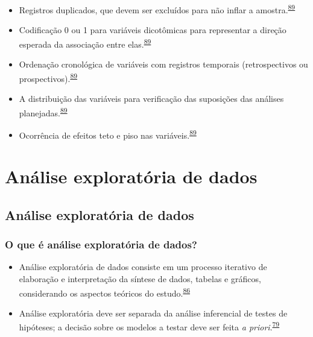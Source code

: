 \documentclass[
  a4paper,
]{book}
\begin{document}
\begin{itemize}
\item
  Registros duplicados, que devem ser excluídos para não inflar a amostra.\textsuperscript{\protect\hyperlink{ref-huebner2016}{89}}
\item
  Codificação 0 ou 1 para variáveis dicotômicas para representar a direção esperada da associação entre elas.\textsuperscript{\protect\hyperlink{ref-huebner2016}{89}}
\item
  Ordenação cronológica de variáveis com registros temporais (retrospectivos ou prospectivos).\textsuperscript{\protect\hyperlink{ref-huebner2016}{89}}
\item
  A distribuição das variáveis para verificação das suposições das análises planejadas.\textsuperscript{\protect\hyperlink{ref-huebner2016}{89}}
\item
  Ocorrência de efeitos teto e piso nas variáveis.\textsuperscript{\protect\hyperlink{ref-huebner2016}{89}}
\end{itemize}

\hypertarget{analise-exploratoria-dados}{%
\chapter{\texorpdfstring{\textbf{Análise exploratória de dados}}{Análise exploratória de dados}}\label{analise-exploratoria-dados}}

\hypertarget{analise-exploratoria}{%
\section{Análise exploratória de dados}\label{analise-exploratoria}}

\hypertarget{o-que-uxe9-anuxe1lise-exploratuxf3ria-de-dados}{%
\subsection{O que é análise exploratória de dados?}\label{o-que-uxe9-anuxe1lise-exploratuxf3ria-de-dados}}

\begin{itemize}
\item
  Análise exploratória de dados consiste em um processo iterativo de elaboração e interpretação da síntese de dados, tabelas e gráficos, considerando os aspectos teóricos do estudo.\textsuperscript{\protect\hyperlink{ref-Ferketich1986}{86}}
\item
  Análise exploratória deve ser separada da análise inferencial de testes de hipóteses; a decisão sobre os modelos a testar deve ser feita \emph{a priori}.\textsuperscript{\protect\hyperlink{ref-zuur2009}{79}}
\end{itemize}
\end{document}

